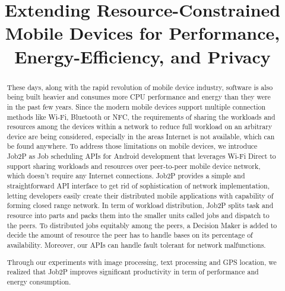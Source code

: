 \documentclass[conference]{IEEEtran}
\begin{document}
%
\title{Extending Resource-Constrained Mobile Devices for Performance, Energy-Efficiency, and Privacy}


\author{
\and
{}
}


\maketitle

\begin{abstract}
These days, along with the rapid revolution of mobile device industry, software is also being built heavier and consumes more CPU performance and energy than they were in the past few years. Since the modern mobile devices support multiple connection methods like Wi-Fi, Bluetooth or NFC, the requirements of sharing the workloads and resources among the devices within a network to reduce full workload on an arbitrary device are being considered, especially in the areas Internet is not available, which can be found anywhere. To address those limitations on mobile devices, we introduce Job2P as Job scheduling APIs for Android development that leverages Wi-Fi Direct to support sharing workloads and resources over peer-to-peer mobile device network, which doesn't require any Internet connections. Job2P provides a simple and straightforward API interface to get rid of sophistication of network implementation, letting developers easily create their distributed mobile applications with capability of forming closed range network. In term of workload distribution, Job2P splits task and resource into parts and packs them into the smaller units called jobs and dispatch to the peers. To distributed jobs equitably among the peers, a Decision Maker is added to decide the amount of resource the peer has to handle bases on its percentage of availability. Moreover, our APIs can handle fault tolerant for network malfunctions. 

Through our experiments with image processing, text processing and GPS location, we realized that Job2P improves significant productivity in term of performance and energy consumption. 
\end{abstract}
\end{document}
